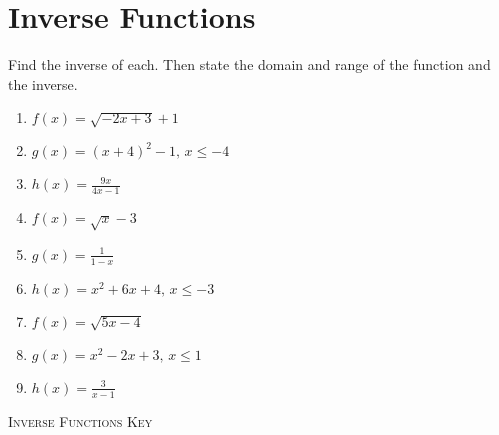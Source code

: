 \chapter{Inverse Functions}

Find the inverse of each. Then state the domain and range of the function and the inverse.

\begin{enumerate}
	\item $f(x) = \sqrt{-2x + 3} + 1$
	\item $g(x) = (x+4)^2 - 1, \, x \leq -4$
	\item $h(x) = \frac{9x}{4x-1}$
	\item $f(x) = \sqrt{x} - 3$
	\item $g(x) = \frac{1}{1-x}$
	\item $h(x) = x^2 + 6x + 4, \, x \leq -3$
	\item $f(x) = \sqrt{5x-4}$
	\item $g(x) = x^2 - 2x + 3, \, x \leq 1$
	\item $h(x) = \frac{3}{x-1}$
\end{enumerate}

\newpage

\textsc{Inverse Functions Key}

